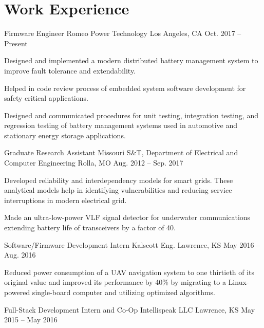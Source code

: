 \section{Work Experience}
\begin{cventries}
  \cventry
    {Firmware Engineer}
    {Romeo Power Technology}
    {Los Angeles, CA}
    {Oct. 2017 -- Present}
    {
      \begin{cvitems}
        \item Designed and implemented a modern distributed battery management system to improve fault tolerance and extendability.
        \item Helped in code review process of embedded system software development for safety critical applications.
        \item Designed and communicated procedures for unit testing, integration testing, and regression testing of battery management systems used in automotive and stationary energy storage applications.
      \end{cvitems}
    }
  \cventry
    {Graduate Research Assistant}
    {Missouri S\&T, Department of Electrical and Computer Engineering}
    {Rolla, MO}
    {Aug. 2012 -- Sep. 2017}
    {
      \begin{cvitems}
        \item Developed reliability and interdependency models for smart grids. These analytical models help in identifying vulnerabilities and reducing service interruptions in modern electrical grid.
        \item Made an ultra-low-power VLF signal detector for underwater communications extending battery life of transceivers by a factor of 40.
      \end{cvitems}
    }
  \cventry
    {Software/Firmware Development Intern}
    {Kalscott Eng.}
    {Lawrence, KS}
    {May 2016 -- Aug. 2016}
    {
      \begin{cvitems}
        \item Reduced power consumption of a UAV navigation system to one thirtieth of its original value and improved its performance by 40\% by migrating to a Linux-powered single-board computer and utilizing optimized algorithms.
      \end{cvitems}
    }
  \cventry
    {Full-Stack Development Intern and Co-Op}
    {Intellispeak LLC}
    {Lawrence, KS}
    {May 2015 -- May 2016}
    {
      \begin{cvitems}

\end{cvitems}}
\end{cventries}
